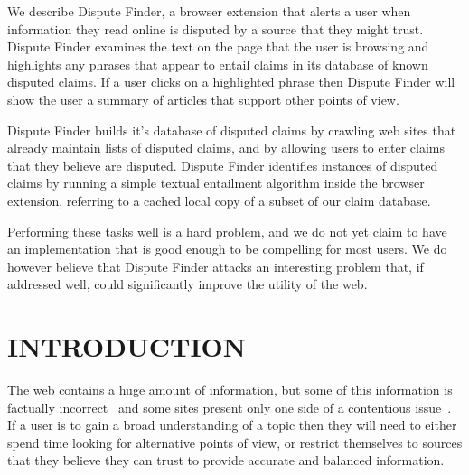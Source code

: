 \documentclass{www2010-submission}
\newcommand{\todo}[1]{}
\begin{document}
\abstract

We describe Dispute Finder, a browser extension that alerts a user when information they read online is disputed by a source that they might trust. Dispute Finder examines the text on the page that the user is browsing and highlights any phrases that appear to entail claims in its database of known disputed claims. If a user clicks on a highlighted phrase then Dispute Finder will show the user a summary of articles that support other points of view.

Dispute Finder builds it's database of disputed claims by crawling web sites that already maintain lists of disputed claims, and by allowing users to enter claims that they believe are disputed. Dispute Finder identifies instances of disputed claims by running a simple textual entailment algorithm inside the browser extension, referring to a cached local copy of a subset of our claim database.

Performing these tasks well is a hard problem, and we do not yet claim to have an implementation that is good enough to be compelling for most users. We do however believe that Dispute Finder attacks an interesting problem that, if addressed well, could significantly improve the utility of the web.






\section{INTRODUCTION}

\todo{update screenshots}
\todo{should this be spun as about news, or information in general}
\todo{need to talk more about what we know about people}
 

The web contains a huge amount of information, but some of this information is factually incorrect~\cite{Neumann2003,Resnik1998,Zhou2004} and some sites present only one side of a contentious issue~\cite{Herman2002}. If a user is to gain a broad understanding of a topic then they will need to either spend time looking for alternative points of view, or restrict themselves to sources that they believe they can trust to provide accurate and balanced information.
\end{document}
